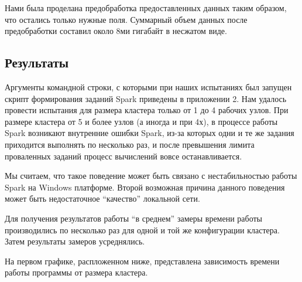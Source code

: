 \documentclass[12pt,a4paper]{report}
\begin{document}
Нами была проделана предобработка предоставленных данных таким образом, что остались только нужные поля. Суммарный объем данных после предобработки составил около 8ми гигабайт в несжатом виде.

\subsection{Результаты}
Аргументы командной строки, с которыми при наших испытаниях был запущен скрипт формирования заданий Spark приведены в приложении 2. Нам удалось провести испытания для размера кластера только от 1 до 4 рабочих узлов. При размере кластера от 5 и более узлов (а иногда и при 4х), в процессе работы Spark возникают внутренние ошибки Spark, из-за которых одни и те же задания приходится выполнять по несколько раз, и после превышения лимита проваленных заданий процесс вычислений вовсе останавливается.

Мы считаем, что такое поведение может быть связано с нестабильностью работы Spark на Windows платформе. Второй возможная причина данного поведения может быть недостаточное ``качество'' локальной сети.

Для получения результатов работы ``в среднем'' замеры времени работы производились по несколько раз для одной и той же конфигурации кластера. Затем результаты замеров усреднялись.

На первом графике, распложенном ниже, представлена зависимость времени работы программы от размера кластера.


\begin{figure}[H]
\centering
\end{figure}
\end{document}
